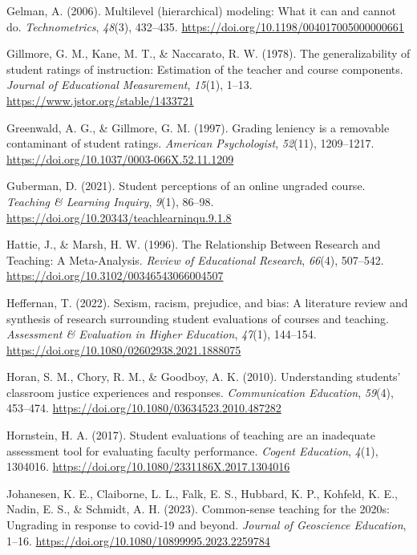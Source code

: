 \documentclass[
  man,mask]{apa7}
\newlength{\cslhangindent}
\newenvironment{CSLReferences}[2] %
 {\begin{list}{}{%
  \setlength{\itemindent}{0pt}
  \setlength{\leftmargin}{0pt}
  \setlength{\parsep}{0pt}
  \ifodd #1
   \setlength{\leftmargin}{\cslhangindent}
   \setlength{\itemindent}{-1\cslhangindent}
  \fi
  \setlength{\itemsep}{#2\baselineskip}}}
 {\end{list}}
\begin{document}
\begin{CSLReferences}{1}{0}
Gelman, A. (2006). Multilevel (hierarchical) modeling: What it can and cannot do. \emph{Technometrics}, \emph{48}(3), 432--435. \url{https://doi.org/10.1198/004017005000000661}

Gillmore, G. M., Kane, M. T., \& Naccarato, R. W. (1978). The generalizability of student ratings of instruction: Estimation of the teacher and course components. \emph{Journal of Educational Measurement}, \emph{15}(1), 1--13. \url{https://www.jstor.org/stable/1433721}

Greenwald, A. G., \& Gillmore, G. M. (1997). Grading leniency is a removable contaminant of student ratings. \emph{American Psychologist}, \emph{52}(11), 1209--1217. \url{https://doi.org/10.1037/0003-066X.52.11.1209}

Guberman, D. (2021). Student perceptions of an online ungraded course. \emph{Teaching \& Learning Inquiry}, \emph{9}(1), 86--98. \url{https://doi.org/10.20343/teachlearninqu.9.1.8}

Hattie, J., \& Marsh, H. W. (1996). The Relationship Between Research and Teaching: A Meta-Analysis. \emph{Review of Educational Research}, \emph{66}(4), 507--542. \url{https://doi.org/10.3102/00346543066004507}

Heffernan, T. (2022). Sexism, racism, prejudice, and bias: A literature review and synthesis of research surrounding student evaluations of courses and teaching. \emph{Assessment \& Evaluation in Higher Education}, \emph{47}(1), 144--154. \url{https://doi.org/10.1080/02602938.2021.1888075}

Horan, S. M., Chory, R. M., \& Goodboy, A. K. (2010). Understanding students' classroom justice experiences and responses. \emph{Communication Education}, \emph{59}(4), 453--474. \url{https://doi.org/10.1080/03634523.2010.487282}

Hornstein, H. A. (2017). Student evaluations of teaching are an inadequate assessment tool for evaluating faculty performance. \emph{Cogent Education}, \emph{4}(1), 1304016. \url{https://doi.org/10.1080/2331186X.2017.1304016}

Johanesen, K. E., Claiborne, L. L., Falk, E. S., Hubbard, K. P., Kohfeld, K. E., Nadin, E. S., \& Schmidt, A. H. (2023). Common-sense teaching for the 2020s: Ungrading in response to covid-19 and beyond. \emph{Journal of Geoscience Education}, 1--16. \url{https://doi.org/10.1080/10899995.2023.2259784}


\end{CSLReferences}
\end{document}

